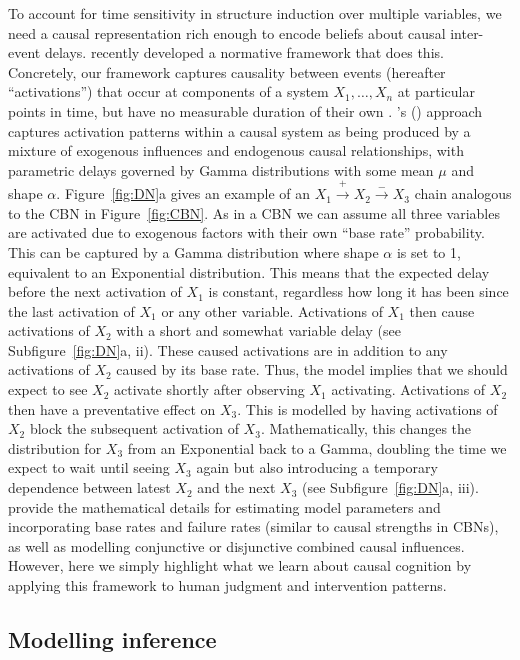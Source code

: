 \documentclass{cambridge7A}%
\def\citeapos#1{\citeauthor{#1}'s (\citeyear{#1})}
\begin{document}
To account for time sensitivity in structure induction over multiple variables, we need a causal representation rich enough to encode beliefs about causal inter-event delays.  
\cite{bramley2018time} recently developed a normative framework that does this. 
Concretely, our framework captures causality between events (hereafter ``activations'') that occur at components of a system $X_1,\ldots,X_n$ at particular points in time, but have no measurable duration of their own \citep{cox1980point}.  \citeapos{bramley2018time} approach captures activation patterns within a causal system as being produced by a mixture of exogenous influences and endogenous causal relationships, with parametric delays governed by Gamma distributions with some mean $\mu$ and shape $\alpha$. Figure~\ref{fig:DN}a gives an example of an  $X_1\!\stackrel{+}\rightarrow\!X_2\!\stackrel{-}\rightarrow\!X_3$ chain analogous to the CBN in Figure~\ref{fig:CBN}.  
As in a CBN we can assume all three variables are activated due to exogenous factors with their own ``base rate'' probability.  This can be captured by a Gamma distribution where shape $\alpha$ is set to 1, equivalent to an Exponential distribution.  This means that the expected delay before the next activation of $X_1$ is constant, regardless how long it has been since the last activation of $X_1$ or any other variable.  Activations of $X_1$ then cause activations of $X_2$ with a short and somewhat variable delay (see Subfigure~\ref{fig:DN}a, ii).  These caused activations are in addition to any activations of $X_2$ caused by its base rate.  Thus, the model implies that we should expect to see $X_2$ activate shortly after observing $X_1$ activating.  Activations of $X_2$ then have a preventative effect on $X_3$.  This is modelled by having activations of $X_2$ block the subsequent activation of $X_3$.  Mathematically, this changes the distribution for $X_3$ from an Exponential back to a Gamma, doubling the time we expect to wait until seeing $X_3$ again but also introducing a temporary dependence between latest $X_2$ and the next $X_3$ (see Subfigure~\ref{fig:DN}a, iii).  \cite{bramley2018time} provide the mathematical details for estimating model parameters and incorporating base rates and failure rates (similar to causal strengths in CBNs), as well as modelling conjunctive or disjunctive combined causal influences. However, here we simply highlight what we learn about causal cognition by applying this framework to human judgment and intervention patterns.  

\subsection{Modelling inference}
\end{document}
